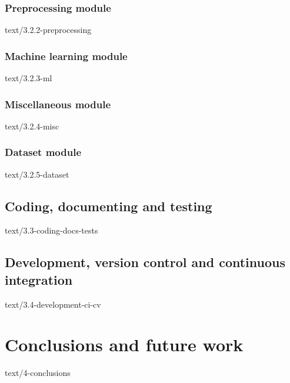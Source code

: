 \documentclass[epsbased,copyleft,final,extendedindex,firstnumbered,tfg, english]{tfgtfmthesisuam}
\begin{document}
  \subsection{Preprocessing module\label{SEC:PREPMOD}}{text/3.2.2-preprocessing}
  \subsection{Machine learning module\label{SEC:MLMOD}}{text/3.2.3-ml}
  \subsection{Miscellaneous module\label{SEC:MISCMOD}}{text/3.2.4-misc}
  \subsection{Dataset module\label{SEC:DATAMOD}}{text/3.2.5-dataset}
\section{Coding, documenting and testing\label{SEC:CODING}}{text/3.3-coding-docs-tests}
\section{Development, version control and continuous integration\label{SEC:DEVELOPMENT}}{text/3.4-development-ci-cv}

\chapter{Conclusions and future work\label{CAP:CONCLUSIONS}}{text/4-conclusions}
\end{document}
